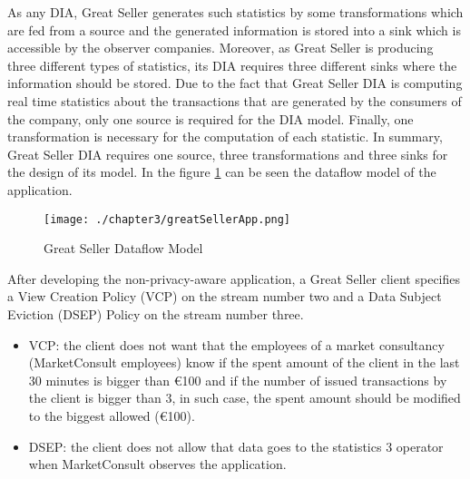 As any DIA, Great Seller generates such statistics by some transformations which are fed from a source and the generated information is stored into a sink which is accessible by the observer companies. Moreover, as Great Seller is producing three different types of statistics, its DIA requires three different sinks where the information should be stored. Due to the fact that Great Seller DIA is computing real time statistics about the transactions that are generated by the consumers of the company, only one source is required for the DIA model. Finally, one transformation is necessary for the computation of each statistic. In summary, Great Seller DIA requires one source, three transformations and three sinks for the design of its model. In the figure \ref{fig:Great Seller Dataflow Model} can be seen the dataflow model of the application.

\begin{figure}
\centering
{\texttt{[image: ./chapter3/greatSellerApp.png]}}
\caption{Great Seller Dataflow Model}
\label{fig:Great Seller Dataflow Model}
\end{figure}

After developing the non-privacy-aware application, a Great Seller client specifies a View Creation Policy (VCP) on the stream number two and a Data Subject Eviction (DSEP) Policy on the stream number three.

\begin{itemize}
\item VCP: the client does not want that the employees of a market consultancy (MarketConsult employees) know if the spent amount of the client in the last 30 minutes is bigger than \euro{100} and if the number of issued transactions by the client is bigger than 3, in such case, the spent amount should be modified to the biggest allowed (\euro{100}).
\item DSEP: the client does not allow that data goes to the statistics 3 operator when MarketConsult observes the application.
\end{itemize}

